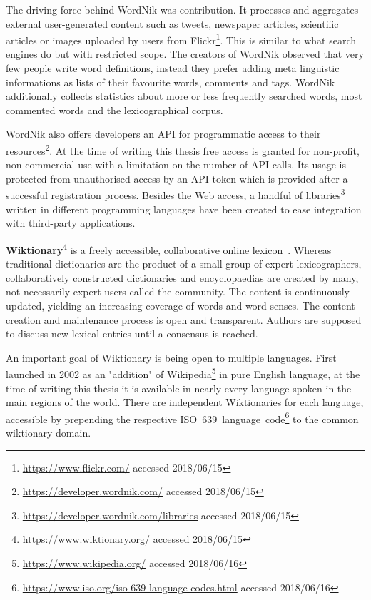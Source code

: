 \documentclass[draft,final]{vutinfth} %
\begin{document}
The driving force behind WordNik was contribution. It processes and aggregates external user-generated content such as tweets, newspaper articles, scientific articles or images uploaded by users from Flickr\footnote{\url{https://www.flickr.com/} accessed 2018/06/15}. This is similar to what search engines do but with restricted scope. The creators of WordNik observed that very few people write word definitions, instead they prefer adding meta linguistic informations as lists of their favourite words, comments and tags. WordNik additionally collects statistics about more or less frequently searched words, most commented words and the lexicographical corpus. 

WordNik also offers developers an API for programmatic access to their resources\footnote{\url{https://developer.wordnik.com/} accessed 2018/06/15}. At the time of writing this thesis free access is granted for non-profit, non-commercial use with a limitation on the number of API calls. 
Its usage is protected from unauthorised access by an API token which is provided after a successful registration process. Besides the Web access, a handful of libraries\footnote{\url{https://developer.wordnik.com/libraries} accessed 2018/06/15} written in different programming languages have been created to ease integration with third-party applications. 

\textbf{Wiktionary}\footnote{\url{https://www.wiktionary.org/} accessed 2018/06/15} is a freely accessible, collaborative online lexicon~\cite{granger2012}. Whereas traditional dictionaries are the product of a small group of expert lexicographers, collaboratively constructed dictionaries and encyclopaedias are created by many, not necessarily expert users called the community. The content is continuously updated, yielding an increasing coverage of words and word senses. The content creation and maintenance process is open and transparent. Authors are supposed to discuss new lexical entries until a consensus is reached. 

An important goal of Wiktionary is being open to multiple languages. First launched in 2002 as an "addition" of Wikipedia\footnote{\url{https://www.wikipedia.org/} accessed 2018/06/16} in pure English language, at the time of writing this thesis it is available in nearly every language spoken in the main regions of the world. There are independent Wiktionaries for each language, accessible by prepending the respective ISO~639~language~code\footnote{\url{https://www.iso.org/iso-639-language-codes.html} accessed 2018/06/16} to the common wiktionary domain.
\end{document}
